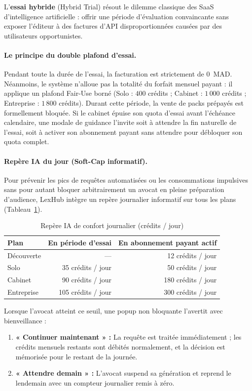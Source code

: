 L'\textbf{essai hybride} (Hybrid Trial) résout le dilemme classique des SaaS d'intelligence artificielle : offrir une période d'évaluation convaincante sans exposer l'éditeur à des factures d'API disproportionnées causées par des utilisateurs opportunistes.

\paragraph{Le principe du double plafond d'essai.}
Pendant toute la durée de l'essai, la facturation est strictement de $0$~MAD. Néanmoins, le système n'alloue pas la totalité du forfait mensuel payant : il applique un plafond Fair-Use borné (Solo : $400$ crédits ; Cabinet : $1\,000$ crédits ; Entreprise : $1\,800$ crédits). Durant cette période, la vente de packs prépayés est formellement bloquée. Si le cabinet épuise son quota d'essai avant l'échéance calendaire, une modale de guidance l'invite soit à attendre la fin naturelle de l'essai, soit à activer son abonnement payant sans attendre pour débloquer son quota complet.

\paragraph{Repère IA du jour (Soft-Cap informatif).}
Pour prévenir les pics de requêtes automatisées ou les consommations impulsives sans pour autant bloquer arbitrairement un avocat en pleine préparation d'audience, LexHub intègre un repère journalier informatif sur tous les plans (Tableau~\ref{tab:daily-cap}).

\begin{table}[H]
\centering
\caption{Repère IA de confort journalier (crédits / jour)}
\label{tab:daily-cap}
\small
\begin{tabular}{@{}lrr@{}}
\toprule
\textbf{Plan} & \textbf{En période d'essai} & \textbf{En abonnement payant actif} \\
\midrule
Découverte & --- & 12 crédits / jour \\
Solo & 35 crédits / jour & 50 crédits / jour \\
Cabinet & 90 crédits / jour & 180 crédits / jour \\
Entreprise & 105 crédits / jour & 300 crédits / jour \\
\bottomrule
\end{tabular}
\end{table}

Lorsque l'avocat atteint ce seuil, une popup non bloquante l'avertit avec bienveillance :
\begin{enumerate}[leftmargin=*]
  \item \textbf{« Continuer maintenant » :} La requête est traitée immédiatement ; les crédits mensuels restants sont débités normalement, et la décision est mémorisée pour le restant de la journée.
  \item \textbf{« Attendre demain » :} L'avocat suspend sa génération et reprend le lendemain avec un compteur journalier remis à zéro.
\end{enumerate}

